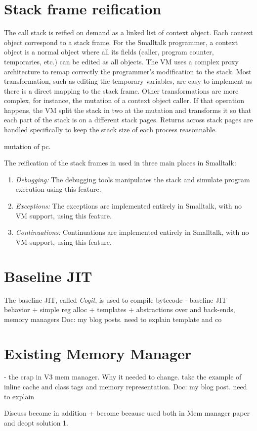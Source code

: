 \documentclass[a4paper,12pt,twoside]{../includes/ThesisStyle}
\begin{document}
\section{Stack frame reification}

The call stack is reified on demand as a linked list of context object. Each context object correspond to a stack frame. For the Smalltalk programmer, a context object is a normal object where all its fields (caller, program counter, temporaries, etc.) can be edited as all objects. The VM uses a complex proxy architecture to remap correctly the programmer's modification to the stack. Most transformation, such as editing the temporary variables, are easy to implement as there is a direct mapping to the stack frame. Other transformations are more complex, for instance, the mutation of a context object caller. If that operation happens, the VM split the stack in two at the mutation and transforms it so that each part of the stack is on a different stack pages. Returns across stack pages are handled specifically to keep the stack size of each process reasonnable.

mutation of pc.

The reification of the stack frames in used in three main places in Smalltalk:
\begin{enumerate}
	\item \emph{Debugging: } The debugging tools manipulates the stack and simulate program execution using this feature.
	\item \emph{Exceptions: } The exceptions are implemented entirely in Smalltalk, with no VM support, using this feature.
	\item \emph{Continuations: } Continuations are implemented entirely in Smalltalk, with no VM support, using this feature.
\end{enumerate}

\section{Baseline JIT}

The baseline JIT, called \emph{Cogit}, is used to compile bytecode
- baseline JIT behavior + simple reg alloc + templates + abstractions over and back-ends, memory managers
Doc: my blog posts. need to explain template and co

\section{Existing Memory Manager}
- the crap in V3 mem manager. Why it needed to change.
take the example of inline cache and class tags and memory representation.
Doc: my blog post. need to explain


Discuss become in addition
+ become because used both in Mem manager paper and deopt solution 1.

\ifx\wholebook\relax\else
    
\end{document}
